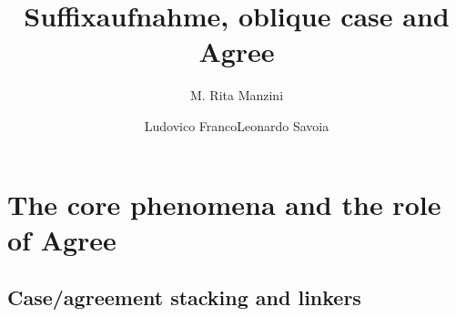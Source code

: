 \documentclass[output=paper]{langsci/langscibook}
\author{M. Rita Manzini\affiliation{Università degli Studi di Firenze}\and Ludovico Franco\affiliation{FCSH, Universidade Nova de Lisboa}\lastand Leonardo Savoia\affiliation{Università degli Studi di Firenze}}
\title{Suffixaufnahme, oblique case and Agree}
\begin{document}
 

 

 

 

 

 

 

 

 

 

 

\section{The core phenomena and the role of Agree}%
\subsection{Case/agreement stacking and linkers} %
\end{document}
